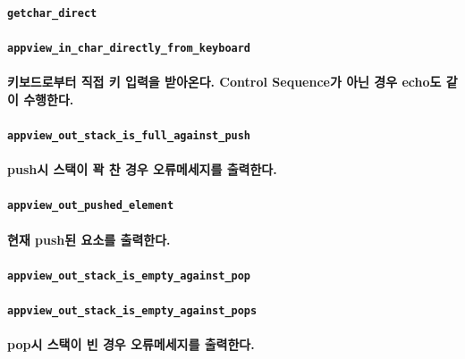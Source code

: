 \documentclass[UTF8]{report}
\begin{document}
            \paragraph{\texttt{getchar\_direct}}
            \paragraph{\texttt{appview\_in\_char\_directly\_from\_keyboard}}
            \paragraph{%
                \normalfont 키보드로부터 직접 키 입력을 받아온다. Control Sequence가 아닌 경우 echo도 같이 수행한다.
            }

            \paragraph{\texttt{appview\_out\_stack\_is\_full\_against\_push}}
            \paragraph{%
                \normalfont push시 스택이 꽉 찬 경우 오류메세지를 출력한다.
            }

            \paragraph{\texttt{appview\_out\_pushed\_element}}
            \paragraph{%
                \normalfont 현재 push된 요소를 출력한다.
            }

            \paragraph{\texttt{appview\_out\_stack\_is\_empty\_against\_pop}}
            \paragraph{\texttt{appview\_out\_stack\_is\_empty\_against\_pops}}
            \paragraph{%
                \normalfont pop시 스택이 빈 경우 오류메세지를 출력한다.
            }
\end{document}

